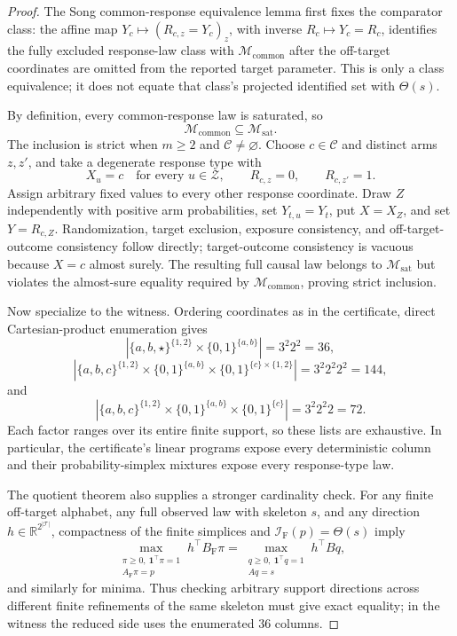 \documentclass{article}
\begin{document}
\begin{proof}
The Song common-response equivalence lemma first fixes the comparator class: the affine map \(Y_c\mapsto(R_{c,z}=Y_c)_z\), with inverse \(R_c\mapsto Y_c=R_c\), identifies the fully excluded response-law class with \(\mathcal M_{\mathrm{common}}\) after the off-target coordinates are omitted from the reported target parameter.  This is only a class equivalence; it does not equate that class's projected identified set with \(\Theta(s)\).

By definition, every common-response law is saturated, so
\[
\mathcal M_{\mathrm{common}}\subseteq\mathcal M_{\mathrm{sat}}.
\]
The inclusion is strict when \(m\ge2\) and \(\mathcal C\ne\varnothing\).  Choose \(c\in\mathcal C\) and distinct arms \(z,z'\), and take a degenerate response type with
\[
X_u=c\quad\text{for every }u\in\mathcal Z,
\qquad R_{c,z}=0,
\qquad R_{c,z'}=1.
\]
Assign arbitrary fixed values to every other response coordinate.  Draw \(Z\) independently with positive arm probabilities, set \(Y_{t,u}=Y_t\), put \(X=X_Z\), and set \(Y=R_{c,Z}\).  Randomization, target exclusion, exposure consistency, and off-target-outcome consistency follow directly; target-outcome consistency is vacuous because \(X=c\) almost surely.  The resulting full causal law belongs to \(\mathcal M_{\mathrm{sat}}\) but violates the almost-sure equality required by \(\mathcal M_{\mathrm{common}}\), proving strict inclusion.

Now specialize to the witness.  Ordering coordinates as in the certificate, direct Cartesian-product enumeration gives
\[
|\{a,b,\star\}^{\{1,2\}}\times\{0,1\}^{\{a,b\}}|
=3^2 2^2=36,
\]
\[
|\{a,b,c\}^{\{1,2\}}\times\{0,1\}^{\{a,b\}}
\times\{0,1\}^{\{c\}\times\{1,2\}}|
=3^2 2^2 2^2=144,
\]
and
\[
|\{a,b,c\}^{\{1,2\}}\times\{0,1\}^{\{a,b\}}
\times\{0,1\}^{\{c\}}|
=3^2 2^2 2=72.
\]
Each factor ranges over its entire finite support, so these lists are exhaustive.  In particular, the certificate's linear programs expose every deterministic column and their probability-simplex mixtures expose every response-type law.

The quotient theorem also supplies a stronger cardinality check.  For any finite off-target alphabet, any full observed law with skeleton \(s\), and any direction \(h\in\mathbb R^{2^{|\mathcal T|}}\), compactness of the finite simplices and \(\mathcal I_{\mathrm F}(p)=\Theta(s)\) imply
\[
\max_{\substack{\pi\ge0,\ \mathbf 1^\top\pi=1\\A_{\mathrm F}\pi=p}}
h^\top B_{\mathrm F}\pi
=
\max_{\substack{q\ge0,\ \mathbf 1^\top q=1\\Aq=s}}
h^\top Bq,
\]
and similarly for minima.  Thus checking arbitrary support directions across different finite refinements of the same skeleton must give exact equality; in the witness the reduced side uses the enumerated \(36\) columns.


\end{proof}
\end{document}
